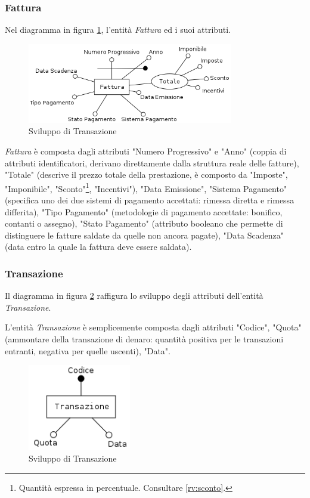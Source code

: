 		\subsubsection{Fattura}
		
			Nel diagramma in figura \ref{fig:fattura}, l'entità \emph{Fattura} ed i suoi attributi.
		
			\begin{figure}[H]
				\centering
				\includegraphics[width=9cm]{images/finitures/fattura.png}
				\caption{Sviluppo di Transazione}
				\label{fig:fattura}
			\end{figure}
			
			\emph{Fattura} è composta dagli attributi "Numero Progressivo" e "Anno" (coppia di attributi identificatori, derivano direttamente dalla struttura reale delle fatture), "Totale" (descrive il prezzo totale della prestazione, è composto da "Imposte", "Imponibile", "Sconto"\footnote{Quantità espressa in percentuale. Consultare \ref{rv:sconto}. }, "Incentivi"), "Data Emissione", "Sistema Pagamento" (specifica uno dei due sistemi di pagamento accettati: rimessa diretta e rimessa differita), "Tipo Pagamento" (metodologie di pagamento accettate: bonifico, contanti o assegno), "Stato Pagamento" (attributo booleano che permette di distinguere le fatture saldate da quelle non ancora pagate), "Data Scadenza" (data entro la quale la fattura deve essere saldata).
		
		\subsubsection{Transazione}
			
			Il diagramma in figura \ref{fig:transazione} raffigura lo sviluppo degli attributi dell'entità \emph{Transazione}.
			
			L'entità \emph{Transazione} è semplicemente composta dagli attributi "Codice", "Quota" (ammontare della transazione di denaro: quantità positiva per le transazioni entranti, negativa per quelle uscenti), "Data".
						
			\begin{figure}[H]
				\centering
				\includegraphics[width=4.5cm]{images/finitures/transazione.png}
				\caption{Sviluppo di Transazione}
				\label{fig:transazione}
			\end{figure}
		
